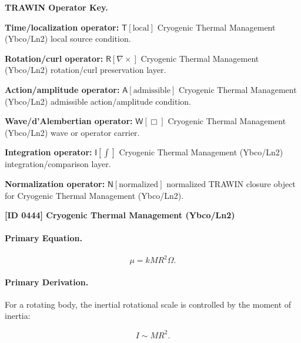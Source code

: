 \par\vspace{0.45\baselineskip}
\noindent\begin{minipage}[t]{\linewidth}
\begingroup
\small
\raggedright
\textbf{TRAWIN Operator Key.}\par
\noindent\textbf{Time/localization operator:} $\mathsf{T}\!\left[\mathrm{local}\right]$ Cryogenic Thermal Management (Ybco/Ln2) local source condition.\par
\noindent\textbf{Rotation/curl operator:} $\mathsf{R}\!\left[\nabla\times\right]$ Cryogenic Thermal Management (Ybco/Ln2) rotation/curl preservation layer.\par
\noindent\textbf{Action/amplitude operator:} $\mathsf{A}\!\left[\mathrm{admissible}\right]$ Cryogenic Thermal Management (Ybco/Ln2) admissible action/amplitude condition.\par
\noindent\textbf{Wave/d'Alembertian operator:} $\mathsf{W}\!\left[\Box\right]$ Cryogenic Thermal Management (Ybco/Ln2) wave or operator carrier.\par
\noindent\textbf{Integration operator:} $\mathsf{I}\!\left[\int\right]$ Cryogenic Thermal Management (Ybco/Ln2) integration/comparison layer.\par
\noindent\textbf{Normalization operator:} $\mathsf{N}\!\left[\mathrm{normalized}\right]$ normalized TRAWIN closure object for Cryogenic Thermal Management (Ybco/Ln2).\par
\endgroup
\end{minipage}

\clearpage
\noindent\textbf{[ID 0444] Cryogenic Thermal Management (Ybco/Ln2)}\par
\vspace{0.35em}
\paragraph{Primary Equation.}
\begin{equation}
\mu
=
kMR^2\Omega .
\end{equation}

\paragraph{Primary Derivation.}
For a rotating body, the inertial rotational scale is controlled by the moment of inertia:

\begin{equation}
I
\sim
MR^2 .
\end{equation}

